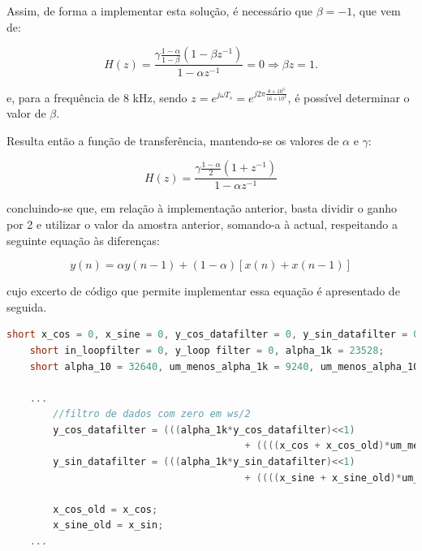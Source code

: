 \documentclass[11pt]{article}
\numberwithin{equation}{section}
\begin{document}
Assim, de forma a implementar esta solução, é necessário que $\beta = -1$, que vem de:

\vspace{-3mm}
\begin{equation}
H(z) = \frac{\gamma \frac{1-\alpha}{1-\beta} (1-\beta z^{-1})}{1-\alpha z^{-1}} = 0 \Rightarrow \beta z = 1.
\end{equation}

\vspace{1mm}
e, para a frequência de 8 kHz, sendo $z = e^{j\omega T_s} = e^{j2\pi \frac{8\times 10^3}{16\times 10^3}}$, é possível determinar o valor de $\beta$.
	
Resulta então a função de transferência, mantendo-se os valores de $\alpha$ e $\gamma$:

\vspace{-3mm}
\begin{equation}
H(z) = \frac{\gamma \frac{1-\alpha}{2} (1+z^{-1})}{1-\alpha z^{-1}}
\end{equation}

\vspace{1mm}
concluindo-se que, em relação à implementação anterior, basta dividir o ganho por 2 e utilizar o valor da amostra anterior, somando-a à actual, respeitando a seguinte equação às diferenças:

\vspace{-3mm}
\begin{equation}
y(n) = \alpha y(n-1) +  (1-\alpha)[x(n) + x(n-1)]
\end{equation} 

\vspace{1mm}
cujo excerto de código que permite implementar essa equação é apresentado de seguida.

\begin{lstlisting}[language=C]
	short x_cos = 0, x_sine = 0, y_cos_datafilter = 0, y_sin_datafilter = 0;  
	short in_loopfilter = 0, y_loop filter = 0, alpha_1k = 23528; 
	short alpha_10 = 32640, um_menos_alpha_1k = 9240, um_menos_alpha_10 = 127;
	
	...
		//filtro de dados com zero em ws/2
		y_cos_datafilter = (((alpha_1k*y_cos_datafilter)<<1) 
										 + ((((x_cos + x_cos_old)*um_menos_alpha_1k)>>1)<<1))>>16;
		y_sin_datafilter = (((alpha_1k*y_sin_datafilter)<<1) 
										 + ((((x_sine + x_sine_old)*um_menos_alpha_1k)>>1)<<1))>>16;

		x_cos_old = x_cos;
		x_sine_old = x_sin;
	...
\end{lstlisting}
\end{document}
